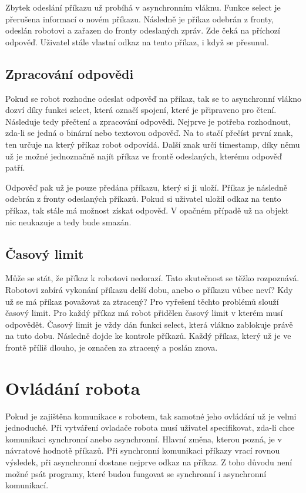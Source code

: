 \documentclass[12pt,notitlepage]{report}
\begin{document}
    Zbytek odeslání příkazu už probíhá v asynchronním vláknu. Funkce select je
    přerušena informací o novém příkazu. Následně je příkaz odebrán z fronty,
    odeslán robotovi a zařazen do fronty odeslaných zpráv. Zde čeká na příchozí
    odpověď. Uživatel stále vlastní odkaz na tento příkaz, i když se přesunul.

    \subsection{Zpracování odpovědi}

    Pokud se robot rozhodne odeslat odpověď na příkaz, tak se to asynchronní
    vlákno dozví díky funkci select, která označí spojení, které je připraveno
    pro čtení. Následuje tedy přečtení a zpracování odpovědi. Nejprve je
    potřeba rozhodnout, zda-li se jedná o binární nebo textovou odpověď. Na to
    stačí přečíst první znak, ten určuje na který příkaz robot odpovídá. Další
    znak určí timestamp, díky němu už je možné jednoznačně najít příkaz ve
    frontě odeslaných, kterému odpověď patří.

    Odpověď pak už je pouze předána příkazu, který si ji uloží. Příkaz je
    následně odebrán z fronty odeslaných příkazů. Pokud si uživatel uložil
    odkaz na tento příkaz, tak stále má možnost získat odpověď. V opačném
    případě už na objekt nic neukazuje a tedy bude smazán.

    \subsection{Časový limit}

    Může se stát, že příkaz k robotovi nedorazí. Tato skutečnost se těžko
    rozpoznává. Robotovi zabírá vykonání příkazu delší dobu, anebo o příkazu
    vůbec neví? Kdy už se má příkaz považovat za ztracený? Pro vyřešení těchto
    problémů slouží časový limit. Pro každý příkaz má robot přidělen časový
    limit v kterém musí odpovědět. Časový limit je vždy dán funkci select,
    která vlákno zablokuje právě na tuto dobu. Následně dojde ke kontrole
    příkazů. Každý příkaz, který už je ve frontě příliš dlouho, je označen za
    ztracený a poslán znova.

    \section{Ovládání robota}
    \label{controller}

    Pokud je zajištěna komunikace s robotem, tak samotné jeho ovládání už je
    velmi jednoduché. Při vytváření ovladače robota musí uživatel specifikovat,
    zda-li chce komunikaci synchronní anebo asynchronní. Hlavní změna, kterou
    pozná, je v návratové hodnotě příkazů. Při synchronní komunikaci příkazy
    vrací rovnou výsledek, při asynchronní dostane nejprve odkaz na příkaz. Z
    toho důvodu není možné psát programy, které budou fungovat se synchronní i
    asynchronní komunikací.
\end{document}
